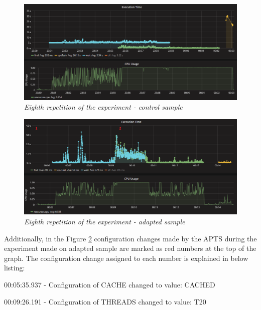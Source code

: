 \documentclass[12pt,a4paper]{article}
\let\tmpone\enumerate
\let\tmptwo\endenumerate
\renewenvironment{enumerate}{\tmpone\addtolength{\itemsep}{-0.4\baselineskip}}{\tmptwo}
\begin{document}
\begin{figure}[!htb]
\centering
\includegraphics[width=1\textwidth]{8-ctrl}
\caption{\textit{Eighth repetition of the experiment - control sample}} \label{figure:random:screen:control:8}
\end{figure}

\begin{figure}[!htb]
\centering
\includegraphics[width=1\textwidth]{8-adap}
\caption{\textit{Eighth repetition of the experiment - adapted sample}} \label{figure:random:screen:adapted:8}
\end{figure}

Additionally, in the Figure \ref{figure:random:screen:adapted:8} configuration changes made by the APTS during the experiment made on adapted sample are marked as red numbers at the top of the graph. The configuration change assigned to each number is explained in below listing: 

\begin{enumerate}
\item 00:05:35.937 - Configuration of CACHE changed to value: CACHED
\item 00:09:26.191 - Configuration of THREADS changed to value: T20
\end{enumerate}
\end{document}
